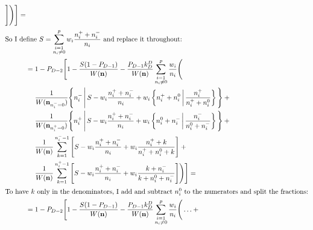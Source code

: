 \documentclass[a4paper]{article}
\theoremstyle{definition}
\begin{document}
\begin{align}
                \Bigg]
            \Bigg)
        \Bigg] = \notag \\
        \intertext{So I define $\displaystyle S = \sum_{\substack{i=1 \\ n_i
        \ne 0}}^p w_i \frac {n^+_i + n^-_i} {n_i}$ and replace it throughout:}
        &= 1 - P_{D-2} \Bigg[
            1 - \frac {S (1 - P_{D-1})} {W(\mathbf n)}
            - \frac {P_{D-1} k^D_D} {W(\mathbf n)}
            \sum_{\substack{i=1 \\ n_i \ne 0}}^p  \frac {w_i} {n_i} \Bigg( \notag \\
                & \phantom{{}={}}
                \frac 1 {W(\mathbf n_{n^-_i=0})} \Bigg\{
                    n^-_i \,\Bigg|\,
                    S -
                    w_i \frac {n^+_i + n^-_i} {n_i} +
                    w_i \left\{
                        n^+_i + n^0_i \,\middle|\,
                        \frac {n^+_i} {n^+_i + n^0_i}
                    \right\}
                \Bigg\} + {} \notag \\
                & \phantom{{}={}}
                \frac 1 {W(\mathbf n_{n^+_i=0})} \Bigg\{
                    n^+_i \,\Bigg|\,
                    S -
                    w_i \frac {n^+_i + n^-_i} {n_i} +
                    w_i \left\{
                        n^0_i + n^-_i \,\middle|\,
                        \frac {n^-_i} {n^0_i + n^-_i}
                    \right\}
                \Bigg\} + {} \notag \\
                & \phantom{{}={}}
                \frac 1 {W(\mathbf n)} \sum_{k=1}^{n^-_i - 1}
                \Bigg[
                    S - w_i \frac {n^+_i + n^-_i} {n_i} +
                    w_i \frac {n^+_i + k} {n^+_i + n^0_i + k}
                \Bigg] + {} \notag \\
                & \phantom{{}={}}
                \frac 1 {W(\mathbf n)} \sum_{k=1}^{n^+_i - 1}
                \Bigg[
                    S - w_i \frac{n^+_i + n^-_i} {n_i} +
                    w_i \frac {k + n^-_i} {k + n^0_i + n^-_i}
                \Bigg]
            \Bigg)
        \Bigg] = \notag \\
        \intertext{To have $k$ only in the denominators, I add and subtract
        $n^0_i$ to the numerators and split the fractions:}
        &= 1 - P_{D-2} \Bigg[
            1 - \frac {S (1 - P_{D-1})} {W(\mathbf n)}
            - \frac {P_{D-1} k^D_D} {W(\mathbf n)}
            \sum_{\substack{i=1 \\ n_i \ne 0}}^p  \frac {w_i} {n_i} \Bigg( \ldots + {} \notag \\

\end{align}
\end{document}
